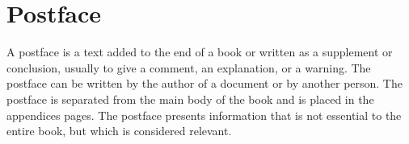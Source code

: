 \chapter*{Postface}

{}
A postface is a text added to the end of a book or written as a supplement or conclusion, usually to give a comment, an explanation, or a warning. The postface can be written by the author of a document or by another person. The postface is separated from the main body of the book and is placed in the appendices pages. The postface presents information that is not essential to the entire book, but which is considered relevant.